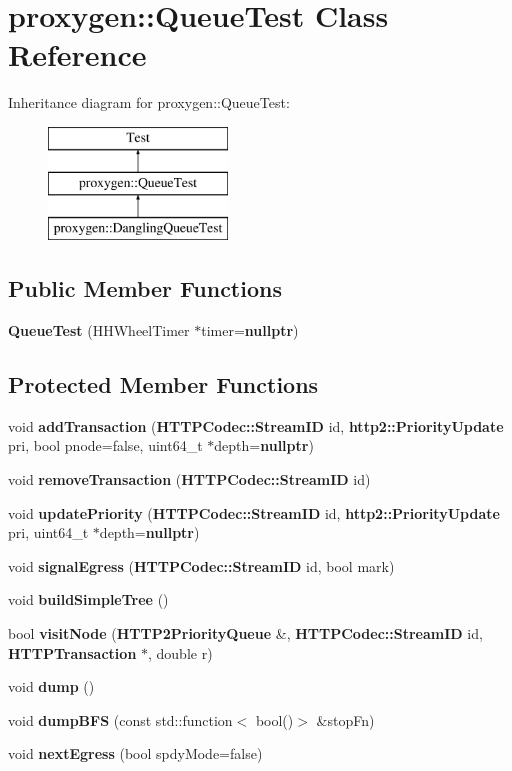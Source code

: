 \section{proxygen\+:\+:Queue\+Test Class Reference}
\label{classproxygen_1_1QueueTest}
Inheritance diagram for proxygen\+:\+:Queue\+Test\+:\begin{figure}[H]
\begin{center}
\leavevmode
\includegraphics[height=3.000000cm]{classproxygen_1_1QueueTest}
\end{center}
\end{figure}
\subsection*{Public Member Functions}
\begin{DoxyCompactItemize}
\item 
{\bf Queue\+Test} (H\+H\+Wheel\+Timer $\ast$timer={\bf nullptr})
\end{DoxyCompactItemize}
\subsection*{Protected Member Functions}
\begin{DoxyCompactItemize}
\item 
void {\bf add\+Transaction} ({\bf H\+T\+T\+P\+Codec\+::\+Stream\+ID} id, {\bf http2\+::\+Priority\+Update} pri, bool pnode=false, uint64\+\_\+t $\ast$depth={\bf nullptr})
\item 
void {\bf remove\+Transaction} ({\bf H\+T\+T\+P\+Codec\+::\+Stream\+ID} id)
\item 
void {\bf update\+Priority} ({\bf H\+T\+T\+P\+Codec\+::\+Stream\+ID} id, {\bf http2\+::\+Priority\+Update} pri, uint64\+\_\+t $\ast$depth={\bf nullptr})
\item 
void {\bf signal\+Egress} ({\bf H\+T\+T\+P\+Codec\+::\+Stream\+ID} id, bool mark)
\item 
void {\bf build\+Simple\+Tree} ()
\item 
bool {\bf visit\+Node} ({\bf H\+T\+T\+P2\+Priority\+Queue} \&, {\bf H\+T\+T\+P\+Codec\+::\+Stream\+ID} id, {\bf H\+T\+T\+P\+Transaction} $\ast$, double r)
\item 
void {\bf dump} ()
\item 
void {\bf dump\+B\+FS} (const std\+::function$<$ bool()$>$ \&stop\+Fn)
\item 
void {\bf next\+Egress} (bool spdy\+Mode=false)
\end{DoxyCompactItemize}
